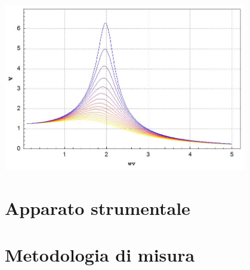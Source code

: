 \documentclass[11pt,a4paper]{article} %
\begin{document}
\lsstyle %

\maketitle %

\begin{center}
	\includegraphics[width=0.8\textwidth]{risonanza}
\end{center}

\begin{abstract}
	\noindent
	
\end{abstract}

\newpage



\tableofcontents %


\section{Apparato strumentale}
	

\section{Metodologia di misura}
	
\end{document}
